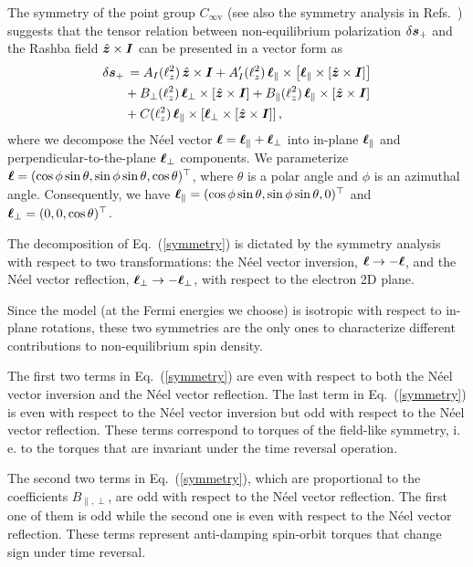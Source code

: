 The symmetry of the point group $C_{\infty\text{v}}$ (see also the symmetry analysis in Refs.~\cite{Duine2012, Garello2013}) suggests that the tensor relation between non-equilibrium polarization $\delta\boldsymbol{s}_+$ and the Rashba field $\hat{\boldsymbol{z}}\times \boldsymbol{I}$ can be presented in a vector form as 
\begin{align}
\delta\boldsymbol{s}_+&\,= A_I(\ell_z^2)\,\hat{\boldsymbol{z}}\times \boldsymbol{I} + A'_I(\ell_z^2)\,\boldsymbol{\ell}_\parallel\times \left[\boldsymbol{\ell}_\parallel\times \left[\hat{\boldsymbol{z}}\times \boldsymbol{I}\right]\right]\nonumber\\
&+ B_\perp(\ell_z^2)\,\boldsymbol{\ell}_\perp\times \left[\hat{\boldsymbol{z}}\times \boldsymbol{I}\right]+B_\parallel(\ell_z^2)\,\boldsymbol{\ell}_\parallel\times \left[\hat{\boldsymbol{z}}\times \boldsymbol{I}\right]\nonumber\\
&+ C(\ell_z^2)\,\boldsymbol{\ell}_\parallel\times \left[\boldsymbol{\ell}_\perp\times \left[\hat{\boldsymbol{z}}\times \boldsymbol{I}\right]\right],
\label{symmetry}
\end{align}
where we decompose the N\'eel vector $\boldsymbol{\ell}=\boldsymbol{\ell}_\parallel+\boldsymbol{\ell}_\perp$ into in-plane $\boldsymbol{\ell}_\parallel$ and perpendicular-to-the-plane $\boldsymbol{\ell}_\perp$ components. We parameterize $\boldsymbol{\ell}=(\cos\phi\sin\theta,\sin\phi\sin\theta,\cos\theta)^\top$, where $\theta$ is a polar angle and $\phi$ is an azimuthal angle. Consequently, we have $\boldsymbol{\ell}_\parallel=(\cos\phi\sin\theta,\sin\phi\sin\theta,0)^\top$ and $\boldsymbol{\ell}_\perp=(0,0,\cos\theta)^\top$.

The decomposition of Eq.~(\ref{symmetry}) is dictated by the symmetry analysis with respect to two transformations: the N\'eel vector inversion, $\boldsymbol{\ell}\to -\boldsymbol{\ell}$, and the N\'eel vector reflection, $\boldsymbol{\ell}_\perp\to -\boldsymbol{\ell}_\perp$, with respect to the electron 2D plane. 

Since the model (at the Fermi energies we choose) is isotropic with respect to in-plane rotations, these two symmetries are the only ones to characterize different contributions to non-equilibrium spin density. 

The first two terms in Eq.~(\ref{symmetry}) are even with respect to both the N\'eel vector inversion and the N\'eel vector reflection. The last term in Eq.~(\ref{symmetry}) is even with respect to the N\'eel vector inversion but odd with respect to the N\'eel vector reflection. These terms correspond to torques of the field-like symmetry, i.\,e. to the torques that are invariant under the time reversal operation. 

The second two terms in Eq.~(\ref{symmetry}), which are proportional to the coefficients $B_{\parallel,\perp}$, are odd with respect to the N\'eel vector reflection. The first one of them is odd while the second one is even with respect to the N\'eel vector reflection. These terms represent anti-damping spin-orbit torques that change sign under time reversal.


